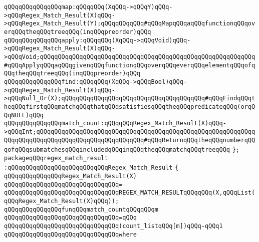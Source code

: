 \newline
\verb|qQQqqQQqqQQqqQQqmap:qQQqqQQq(XqQQq->qQQqY)qQQq->qQQqRegex_Match_Result(X)qQQq->qQQqRegex_Match_Result(Y);qQQqqQQqqQQq#qQQqMapqQQqaqQQqfunctionqQQqoverqQQqtheqQQqtreeqQQq(inqQQqpreorder)qQQq|\newline
\newline
\verb|qQQqqQQqqQQqqQQqapply:qQQqqQQq(XqQQq->qQQqVoid)qQQq->qQQqRegex_Match_Result(X)qQQq->qQQqVoid;qQQqqQQqqQQqqQQqqQQqqQQqqQQqqQQqqQQqqQQqqQQqqQQqqQQqqQQqqQQq#qQQqApplyqQQqaqQQqgivenqQQqfunctionqQQqoverqQQqeverqQQqelementqQQqofqQQqtheqQQqtreeqQQq(inqQQqpreorder)qQQq|\newline
\newline
\verb|qQQqqQQqqQQqqQQqfind:qQQqqQQq(XqQQq->qQQqBool)qQQq->qQQqRegex_Match_Result(X)qQQq->qQQqNull_Or(X);qQQqqQQqqQQqqQQqqQQqqQQqqQQqqQQqqQQqqQQq#qQQqFindqQQqtheqQQqfirstqQQqmatchqQQqthatqQQqsatisfiesqQQqtheqQQqpredicateqQQq(orqQQqNULL)qQQq|\newline
\newline
\verb|qQQqqQQqqQQqqQQqmatch_count:qQQqqQQqRegex_Match_Result(X)qQQq->qQQqInt;qQQqqQQqqQQqqQQqqQQqqQQqqQQqqQQqqQQqqQQqqQQqqQQqqQQqqQQqqQQqqQQqqQQqqQQqqQQqqQQqqQQqqQQqqQQqqQQqqQQq#qQQqReturnqQQqtheqQQqnumberqQQqofqQQqsubmatchesqQQqincludedqQQqinqQQqtheqQQqmatchqQQqtreeqQQq|\newline
\verb|};|\newline
\newline
\newline
\newline
\verb|packageqQQqregex_match_result|\newline
\verb|:qQQqqQQqqQQqqQQqqQQqqQQqqQQqRegex_Match_Result|\newline
\verb|{|\newline
\verb|qQQqqQQqqQQqqQQqRegex_Match_Result(X)|\newline
\verb|qQQqqQQqqQQqqQQqqQQqqQQqqQQqqQQq=|\newline
\verb|qQQqqQQqqQQqqQQqqQQqqQQqqQQqqQQqREGEX_MATCH_RESULTqQQqqQQq(X,qQQqList(qQQqRegex_Match_Result(X)qQQq));|\newline
\newline
\verb|qQQqqQQqqQQqqQQqfunqQQqmatch_countqQQqqQQqm|\newline
\verb|qQQqqQQqqQQqqQQqqQQqqQQqqQQqqQQq=qQQq|\newline
\verb|qQQqqQQqqQQqqQQqqQQqqQQqqQQqqQQq(count_listqQQq[m])qQQq-qQQq1|\newline
\verb|qQQqqQQqqQQqqQQqqQQqqQQqqQQqqQQqwhere|\newline
